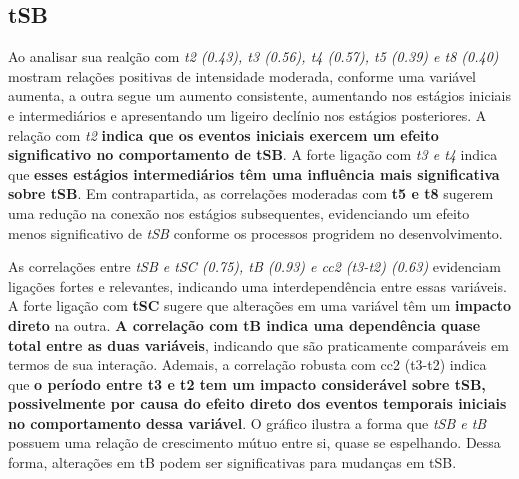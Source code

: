 \subsection*{tSB}
Ao analisar sua realção com \textit{t2 (0.43), t3 (0.56), t4 (0.57), t5 (0.39) e t8 (0.40)} mostram relações positivas de intensidade moderada, conforme uma variável aumenta, a outra segue um aumento consistente, aumentando nos estágios iniciais e intermediários e apresentando um ligeiro declínio nos estágios posteriores. A relação com \textit{t2} \textbf{indica que os eventos iniciais exercem um efeito significativo no comportamento de \textbf{tSB}}. A forte ligação com \textit{t3 e t4} indica que \textbf{esses estágios intermediários têm uma influência mais significativa sobre \textbf{tSB}}. Em contrapartida, as correlações moderadas com \textbf{t5 e t8} sugerem uma redução na conexão nos estágios subsequentes, evidenciando um efeito menos significativo de \textit{tSB} conforme os processos progridem no desenvolvimento.

As correlações entre \textit{tSB e tSC (0.75), tB (0.93) e cc2 (t3-t2) (0.63)} evidenciam ligações fortes e relevantes, indicando uma interdependência entre essas variáveis. A forte ligação com \textbf{tSC} sugere que alterações em uma variável têm um \textbf{impacto direto} na outra. \textbf{A correlação com tB indica uma dependência quase total entre as duas variáveis}, indicando que são praticamente comparáveis em termos de sua interação. Ademais, a correlação robusta com cc2 (t3-t2) indica que \textbf{o período entre t3 e t2 tem um impacto considerável sobre tSB, possivelmente por causa do efeito direto dos eventos temporais iniciais no comportamento dessa variável}. O gráfico ilustra a forma que \textit{tSB e tB} possuem uma relação de crescimento mútuo entre si, quase se espelhando. Dessa forma, alterações em tB podem ser significativas para mudanças em tSB.

